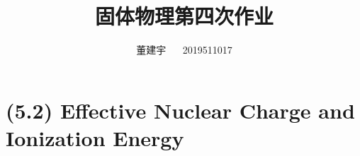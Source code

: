 \documentclass[reqno,a4paper,12pt]{amsart}
\title{固体物理第四次作业}
\author{董建宇 ~~ 2019511017}
\begin{document}
\maketitle
\titleformat{\section}[hang]{\small}{\thesection}{0.8em}{}{}
\titleformat{\subsection}[hang]{\small}{\thesubsection}{0.8em}{}{}

\section{\textbf{(5.2) Effective Nuclear Charge and Ionization Energy}}
\end{document}
